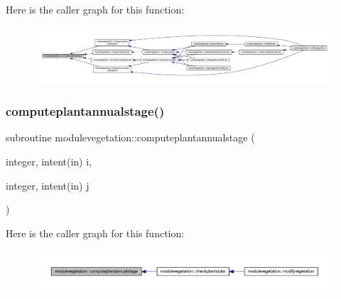 Here is the caller graph for this function\+:\nopagebreak
\begin{figure}[H]
\begin{center}
\leavevmode
\includegraphics[width=350pt]{namespacemodulevegetation_abdb0b0a9e6c19d706d25ff42b84611d2_icgraph}
\end{center}
\end{figure}
\mbox{\label{namespacemodulevegetation_aeb0bf58b2fe65989291c935b652a185e}} 
\subsubsection{\texorpdfstring{computeplantannualstage()}{computeplantannualstage()}}
{\footnotesize\ttfamily subroutine modulevegetation\+::computeplantannualstage (\begin{DoxyParamCaption}\item[{integer, intent(in)}]{i,  }\item[{integer, intent(in)}]{j }\end{DoxyParamCaption})\hspace{0.3cm}{\ttfamily [private]}}

Here is the caller graph for this function\+:\nopagebreak
\begin{figure}[H]
\begin{center}
\leavevmode
\includegraphics[width=350pt]{namespacemodulevegetation_aeb0bf58b2fe65989291c935b652a185e_icgraph}
\end{center}
\end{figure}
\mbox{\label{namespacemodulevegetation_a57fef770d6b519b24b11d4ce771e5c20}} 
